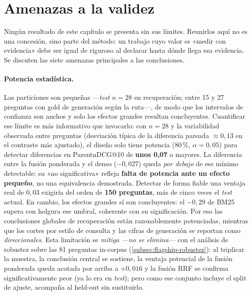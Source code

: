\section{Amenazas a la validez}
\label{sec:amenazas}

Ningún resultado de este capítulo se presenta sin sus límites. Reunirlos aquí no es una concesión, sino parte del método: un trabajo cuyo valor es «medir con evidencia» debe ser igual de riguroso al declarar hasta dónde llega esa evidencia. Se discuten las siete amenazas principales a las conclusiones.

\paragraph{Potencia estadística.} Las particiones son pequeñas —\emph{test} $n=28$ en recuperación; entre 15 y 27 preguntas con gold de generación según la ruta—, de modo que los intervalos de confianza son anchos y solo los efectos grandes resultan concluyentes. Cuantificar ese límite es más informativo que invocarlo: con $n=28$ y la variabilidad observada entre preguntas (desviación típica de la diferencia pareada $\approx 0{,}13$ en el contraste más ajustado), el diseño solo tiene potencia (80\,\%, $\alpha=0{,}05$) para detectar diferencias en ParentnDCG@10 de \textbf{unos 0,07} o mayores. La diferencia entre la fusión ponderada y el denso ($-0{,}027$) queda \emph{por debajo} de ese mínimo detectable: su «no significativa» refleja \textbf{falta de potencia ante un efecto pequeño}, no una equivalencia demostrada. Detectar de forma fiable una ventaja real de $0{,}03$ exigiría del orden de \textbf{150 preguntas}, más de cinco veces el \emph{test} actual. En cambio, los efectos grandes sí son concluyentes: el $-0{,}29$ de BM25 supera con holgura ese umbral, coherente con su significación. Por eso las conclusiones globales de recuperación están razonablemente potenciadas, mientras que los cortes por estilo de consulta y las cifras de generación se reportan como \emph{direccionales}. Esta limitación se \emph{mitiga —no se elimina—} con el análisis de robustez sobre las 81 preguntas in-corpus (\ref{subsec:flagship-robustez}): al triplicar la muestra, la conclusión central se sostiene, la ventaja potencial de la fusión ponderada queda acotada por arriba a $+0{,}016$ y la fusión RRF se confirma significativamente peor (ya lo era en \emph{test}); pero como ese conjunto incluye el split de ajuste, acompaña al held-out sin sustituirlo.

